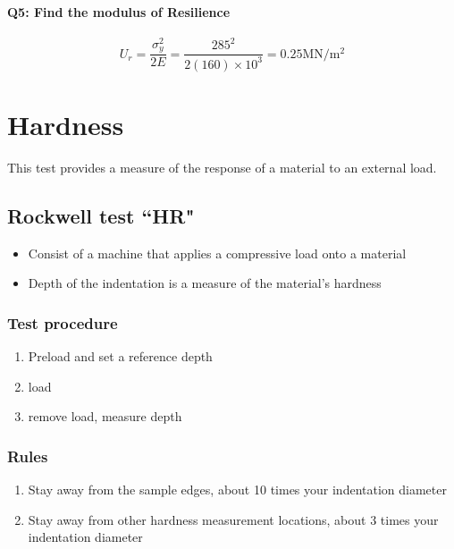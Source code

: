 \documentclass{article}
\begin{document}
\paragraph{Q5: Find the modulus of Resilience}

\begin{displaymath}
U_r = \frac{\sigma_y^2}{2E} = \frac{285^2}{2(160)\times10^3} = 0.25\si{\MN\per\m\squared}
\end{displaymath}

\section{Hardness}

This test provides a measure of the response of a material to an external load.

\subsection{Rockwell test ``HR"}

\begin{itemize}
    \item Consist of a machine that applies a compressive load onto a material
    \item Depth of the indentation is a measure of the material's hardness
\end{itemize}

\subsubsection{Test procedure}

\begin{enumerate}
    \item Preload and set a reference depth
    \item load
    \item remove load, measure depth
\end{enumerate}

\subsubsection{Rules}

\begin{enumerate}
    \item Stay away from the sample edges, about 10 times your indentation diameter
    \item Stay away from other hardness measurement locations, about 3 times your indentation diameter
\end{enumerate}
\end{document}
